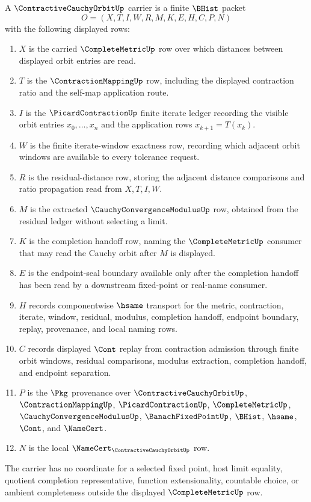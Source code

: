 \begin{definition}
\label{def:contractive-cauchy-orbit-carrier}
A $\ContractiveCauchyOrbitUp$ carrier is a finite $\BHist$ packet
$$
O=(X,T,I,W,R,M,K,E,H,C,P,N)
$$
with the following displayed rows:
\begin{enumerate}
\item $X$ is the carried $\CompleteMetricUp$ row over which distances between displayed orbit entries are read.
\item $T$ is the $\ContractionMappingUp$ row, including the displayed contraction ratio and the self-map application route.
\item $I$ is the $\PicardContractionUp$ finite iterate ledger recording the visible orbit entries $x_0,\ldots,x_n$ and the application rows $x_{k+1}=T(x_k)$.
\item $W$ is the finite iterate-window exactness row, recording which adjacent orbit windows are available to every tolerance request.
\item $R$ is the residual-distance row, storing the adjacent distance comparisons and ratio propagation read from $X,T,I,W$.
\item $M$ is the extracted $\CauchyConvergenceModulusUp$ row, obtained from the residual ledger without selecting a limit.
\item $K$ is the completion handoff row, naming the $\CompleteMetricUp$ consumer that may read the Cauchy orbit after $M$ is displayed.
\item $E$ is the endpoint-seal boundary available only after the completion handoff has been read by a downstream fixed-point or real-name consumer.
\item $H$ records componentwise $\hsame$ transport for the metric, contraction, iterate, window, residual, modulus, completion handoff, endpoint boundary, replay, provenance, and local naming rows.
\item $C$ records displayed $\Cont$ replay from contraction admission through finite orbit windows, residual comparisons, modulus extraction, completion handoff, and endpoint separation.
\item $P$ is the $\Pkg$ provenance over $\ContractiveCauchyOrbitUp$, $\ContractionMappingUp$, $\PicardContractionUp$, $\CompleteMetricUp$, $\CauchyConvergenceModulusUp$, $\BanachFixedPointUp$, $\BHist$, $\hsame$, $\Cont$, and $\NameCert$.
\item $N$ is the local $\NameCert_{\ContractiveCauchyOrbitUp}$ row.
\end{enumerate}
The carrier has no coordinate for a selected fixed point, host limit equality, quotient completion representative, function extensionality, countable choice, or ambient completeness outside the displayed $\CompleteMetricUp$ row.
\end{definition}

